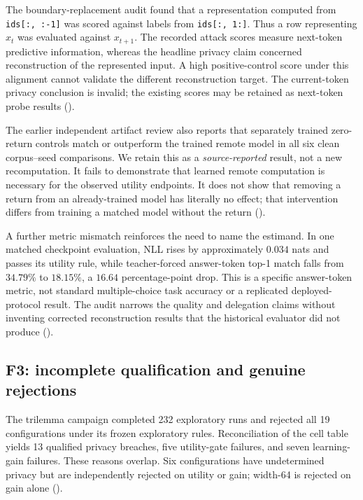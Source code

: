 The boundary-replacement audit found that a representation computed from
\texttt{ids[:, :-1]} was scored against labels from \texttt{ids[:, 1:]}.
Thus a row representing $x_t$ was evaluated against $x_{t+1}$. The recorded
attack scores measure next-token predictive information, whereas the
headline privacy claim concerned reconstruction of the represented input.
A high positive-control score under this alignment cannot validate the
different reconstruction target. The current-token privacy conclusion is
invalid; the existing scores may be retained as next-token probe results
().

The earlier independent artifact review also reports that separately
trained zero-return controls match or outperform the trained remote model
in all six clean corpus--seed comparisons. We retain this as a
\emph{source-reported} result, not a new recomputation. It fails to
demonstrate that learned remote computation is necessary for the observed
utility endpoints. It does not show that removing a return from an
already-trained model has literally no effect; that intervention differs
from training a matched model without the return ().

A further metric mismatch reinforces the need to name the estimand. In
one matched checkpoint evaluation, NLL rises by approximately $0.034$
nats and passes its utility rule, while teacher-forced answer-token top-1
match falls from $34.79\%$ to $18.15\%$, a $16.64$ percentage-point drop.
This is a specific answer-token metric, not standard multiple-choice task
accuracy or a replicated deployed-protocol result. The audit narrows the
quality and delegation claims without inventing corrected reconstruction
results that the historical evaluator did not produce ().

\subsection{F3: incomplete qualification and genuine rejections}
\label{sec:f3}

The trilemma campaign completed 232 exploratory runs and rejected all
19 configurations under its frozen exploratory rules. Reconciliation of
the cell table yields 13 qualified privacy breaches, five utility-gate
failures, and seven learning-gain failures. These reasons overlap. Six
configurations have undetermined privacy but are independently rejected
on utility or gain; width-64 is rejected on gain alone ().

